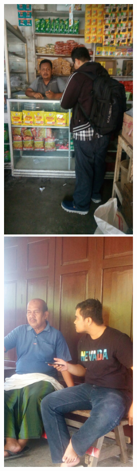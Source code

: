 \begin{figure}[H]
	\includegraphics [height = 12cm]{gambar/wawancara/wawancara2}
	\includegraphics [height = 12cm]{gambar/wawancara/wawancara4}
\end{figure}



